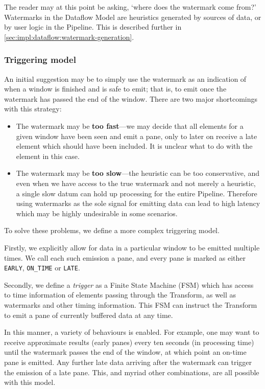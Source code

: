 The reader may at this point be asking, `where does the watermark come from?'
Watermarks in the Dataflow Model are heuristics generated by sources of data, or by user logic in the Pipeline.
This is described further in \cref{sec:impl:dataflow:watermark-generation}.

\subsubsection{Triggering model}

An initial suggestion may be to simply use the watermark as an indication of when a window is finished and is safe to emit; that is, to emit once the watermark has passed the end of the window.
There are two major shortcomings with this strategy:
\begin{itemize}
	\item The watermark may be \textbf{too fast}---we may decide that all elements for a given window have been seen and emit a pane, only to later on receive a late element which should have been included.
	It is unclear what to do with the element in this case.
	
	\item The watermark may be \textbf{too slow}---the heuristic can be too conservative, and even when we have access to the true watermark and not merely a heuristic, a single slow datum can hold up processing for the entire Pipeline.
	Therefore using watermarks as the sole signal for emitting data can lead to high latency which may be highly undesirable in some scenarios.
\end{itemize} 

To solve these problems, we define a more complex triggering model.

Firstly, we explicitly allow for data in a particular window to be emitted multiple times.
We call each such emission a pane, and every pane is marked as either \verb|EARLY|, \verb|ON_TIME| or \verb|LATE|.

Secondly, we define a \emph{trigger} as a Finite State Machine (FSM) which has access to time information of elements passing through the Transform, as well as watermarks and other timing information.
This FSM can instruct the Transform to emit a pane of currently buffered data at any time.

In this manner, a variety of behaviours is enabled.
For example, one may want to receive approximate results (early panes) every ten seconds (in processing time) until the watermark passes the end of the window, at which point an on-time pane is emitted.
Any further late data arriving after the watermark can trigger the emission of a late pane.
This, and myriad other combinations, are all possible with this model.

